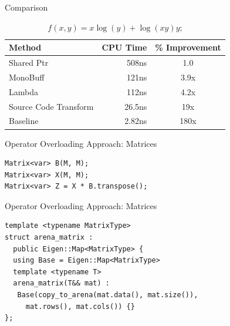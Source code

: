 \documentclass[dvipsnames]{beamer}
\begin{document}
\begin{frame}{Comparison}
\begin{table}
  \centering %
  \caption{$f(x, y) = x\log(y) + \log(xy) y$;} %
  \label{tab:firsttable} %
  \begin{tabular}{|l|r|c|} %
    \hline %
    Method & CPU Time & \% Improvement \\ %
    \hline %
    Shared Ptr & 508ns & 1.0 \\
    MonoBuff   & 121ns & 3.9x \\
    Lambda     & 112ns & 4.2x \\
    Source Code Transform        &  26.5ns & 19x \\
    Baseline & 2.82ns & 180x\\
    \hline %
  \end{tabular}
\end{table}
\end{frame}

\begin{frame}[fragile]{Operator Overloading Approach: Matrices}
\begin{verbatim}
Matrix<var> B(M, M);
Matrix<var> X(M, M);
Matrix<var> Z = X * B.transpose();
\end{verbatim}
\end{frame}

\begin{frame}[fragile]{Operator Overloading Approach: Matrices}
\begin{verbatim}
template <typename MatrixType>
struct arena_matrix :
  public Eigen::Map<MatrixType> {
  using Base = Eigen::Map<MatrixType>
  template <typename T>
  arena_matrix(T&& mat) :
   Base(copy_to_arena(mat.data(), mat.size()),
     mat.rows(), mat.cols()) {}
};
\end{verbatim}
\end{frame}
\end{document}

